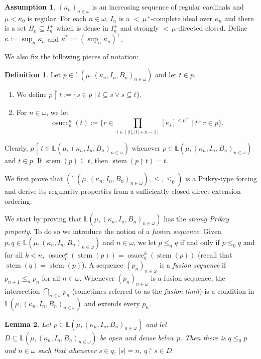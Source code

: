 \documentclass[a4paper]{amsart}
\theoremstyle{definition}
\newtheorem{mydef}{Definition}[section]
\newtheorem*{myass}{Assumption}
\theoremstyle{remark}
\theoremstyle{plain}
\newtheorem{mylem}[mydef]{Lemma}
\numberwithin{mydef}{section}
\DeclareMathOperator{\stem}{stem}
\DeclareMathOperator{\osucc}{osucc}
\newcommand{\dL}{\mathbb{L}}
\newcommand{\uhr}{\upharpoonright}
\begin{document}
	\begin{myass}
		$(\kappa_n)_{n\in\omega}$ is an increasing sequence of regular cardinals and $\mu<\kappa_0$ is regular. For each $n\in\omega$, $I_n$ is a ${<}\,\mu^+$-complete ideal over $\kappa_n$ and there is a set $B_n\subseteq I_n^+$ which is dense in $I_n^+$ and strongly ${<}\,\mu$-directed closed. Define $\kappa:=\sup_n\kappa_n$ and $\kappa^*:=(\sup_n\kappa_n)^+$.
	\end{myass}
	
	We also fix the following pieces of notation:
	
	\begin{mydef}
		Let $p\in\dL(\mu,(\kappa_n,I_n,B_n)_{n\in\omega})$ and let $t\in p$.
		\begin{enumerate}
			\item We define $p\uhr t:=\{s\in p\;|\;t\subseteq s\vee s\subseteq t\}$.
			\item For $n\in\omega$, we let
			$$\osucc_p^n(t):=\{r\in\prod_{i\in[|t|,|t|+n-1]}[\kappa_i]^{<\mu^+}\;|\;t^{\frown}r\in p\}.$$
		\end{enumerate}
	\end{mydef}
	
	Clearly, $p\uhr t\in\dL(\mu,(\kappa_n,I_n,B_n)_{n\in\omega})$ whenever $p\in\dL(\mu,(\kappa_n,I_n,B_n)_{n\in\omega})$ and $t\in p$. If $\stem(p)\subseteq t$, then $\stem(p\uhr t)=t$.
	
	We first prove that $(\dL(\mu,(\kappa_n,I_n,B_n)_{n\in\omega}),\leq,\leq_0)$ is a Prikry-type forcing and derive its regularity properties from a sufficiently closed direct extension ordering.
	
	We start by proving that $\dL(\mu,(\kappa_n,I_n,B_n)_{n\in\omega})$ has the \emph{strong Prikry property}. To do so we introduce the notion of a \emph{fusion sequence}: Given $p,q\in\dL(\mu,(\kappa_n,I_n,B_n)_{n\in\omega})$ and $n\in\omega$, we let $p\leq_nq$ if and only if $p\leq_0 q$ and for all $k<n$, $\osucc_p^k(\stem(p))=\osucc_q^k(\stem(p))$ (recall that $\stem(q)=\stem(p)$). A sequence $(p_n)_{n\in\omega}$ is a \emph{fusion sequence} if $p_{n+1}\leq_np_n$ for all $n\in\omega$. Whenever $(p_n)_{n\in\omega}$ is a fusion sequence, the intersection $\bigcap_{n\in\omega}p_n$ (sometimes referred to as the \emph{fusion limit}) is a condition in $\dL(\mu,(\kappa_n,I_n,B_n)_{n\in\omega})$ and extends every $p_n$.
	
	\begin{mylem}\label{StrongPrikry}
		Let $p\in\dL(\mu,(\kappa_n,I_n,B_n)_{n\in\omega})$ and let $D\subseteq\dL(\mu,(\kappa_n,I_n,B_n)_{n\in\omega})$ be open and dense below $p$. Then there is $q\leq_0p$ and $n\in\omega$ such that whenever $s\in q$, $|s|=n$, $q\uhr s\in D$.
	\end{mylem}
	
\end{document}
